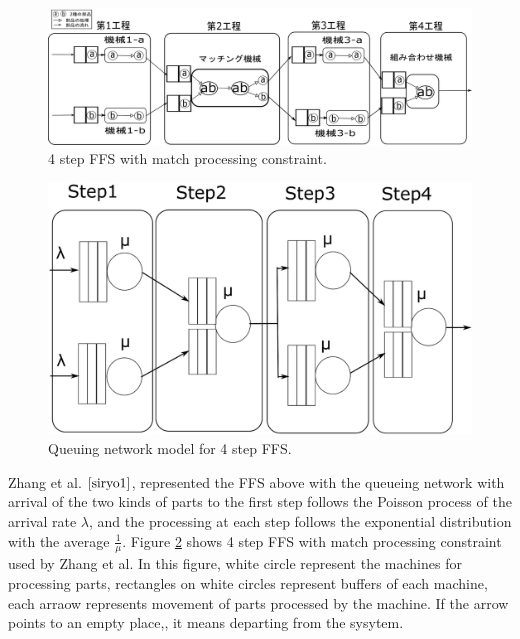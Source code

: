 \begin{figure}[t]
	\begin{center}
		\includegraphics[width=\hsize]{fig/model_ver5.eps}
	\end{center}
	\caption{4 step FFS with match processing constraint.}
	\label{fig:ffs}
\end{figure}


\begin{figure}[h]
	\begin{center}
		\includegraphics[clip, width=\hsize]{fig/queue-ori-eng.eps}
	\end{center}
	\caption{Queuing network model for 4 step FFS.}
	\label{fig:queue}
\end{figure}

Zhang et al. $\cite{siryo1}$, represented the FFS above with the queueing network with arrival of the two kinds of parts to the first step follows the Poisson process of the arrival rate $\lambda$, and the processing at each step follows the exponential distribution with the average $\frac{1}{\mu}$.
Figure \ref{fig:queue} shows 4 step FFS with match processing constraint used by Zhang et al.
In this figure, white circle represent the machines for processing parts, rectangles on white circles represent buffers of each machine, each arraow represents movement of parts processed by the machine.
If the arrow points to an empty place,, it means departing from the sysytem.

